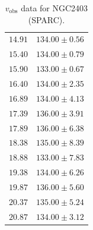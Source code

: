 \documentclass{article}
\newcommand\vobs{\ensuremath{v_{\textrm{obs}}}}
\begin{document}
\begin{table}[h!]
\begin{tabular}{|c|c|}
        $14.91$ & $134.00 \pm 0.56$ \\
        $15.40$ & $134.00 \pm 0.79$ \\
        $15.90$ & $133.00 \pm 0.67$ \\
        $16.40$ & $134.00 \pm 2.35$ \\
        $16.89$ & $134.00 \pm 4.13$ \\
        $17.39$ & $136.00 \pm 3.91$ \\
        $17.89$ & $136.00 \pm 6.38$ \\
        $18.38$ & $135.00 \pm 8.39$ \\
        $18.88$ & $133.00 \pm 7.83$ \\
        $19.38$ & $134.00 \pm 6.26$ \\
        $19.87$ & $136.00 \pm 5.60$ \\
        $20.37$ & $135.00 \pm 5.24$ \\
        $20.87$ & $134.00 \pm 3.12$ \\
        \hline
    \end{tabular}
    \caption{$\vobs$ data for NGC2403 (SPARC).}
    \label{tab:raw2403}
\end{table}
\end{document}
